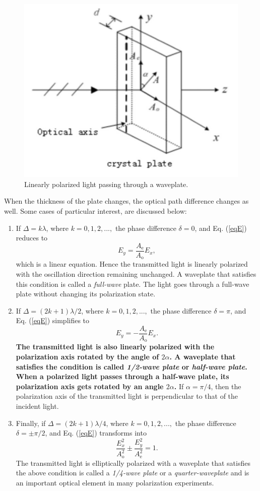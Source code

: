 \documentclass{article}
\begin{document}
\begin{figure}[H]\centering
\includegraphics[scale=1.0]{crystal.png}
\caption{Linearly polarized light passing through a waveplate.}\label{FigCrystal}
\end{figure}

When the thickness of the plate changes, the optical path difference changes as well. Some cases of particular interest, are discussed below: 

\begin{enumerate}[$\blacktriangleright$]
\item If $\Delta = k\lambda$, where $k = 0,1,2,...,$ the phase difference $\delta = 0$, and Eq. (\ref{eqE}) reduces to
$$E_y = \frac{A_\text{e}}{A_\text{o}}E_x,$$
which is a linear equation. Hence the transmitted light is linearly polarized with the oscillation direction remaining unchanged. A waveplate that satisfies this condition is called a \textit{full-wave} plate. The light goes through a full-wave plate without changing its polarization state.
\item If $\Delta = (2k + 1)\lambda/2$, where $k = 0,1,2,...,$ the phase difference $\delta = \pi$, and Eq. (\ref{eqE}) simplifies to
$$E_y = -\frac{A_\text{e}}{A_\text{o}}E_x.$$  
\textbf{The transmitted light is also linearly polarized with the polarization axis rotated by the angle of $2\alpha$. A waveplate that satisfies the condition is called \textit{1/2-wave plate} or \textit{half-wave plate}. When a polarized light passes through a half-wave plate, its polarization axis gets rotated by an angle $2\alpha$.} If $\alpha = \pi/4$, then the polarization axis of the transmitted light is perpendicular to that of the incident light.
\item Finally, if $\Delta = (2k + 1)\lambda/4$, where $k = 0,1,2,...,$ the phase difference $\delta = \pm\pi/2$, and Eq. (\ref{eqE}) transforms into
$$\frac{E_x^2}{A_\text{o}^2} \pm \frac{E_y^2}{A_\text{e}^2} = 1.$$
The transmitted light is elliptically polarized with a waveplate that satisfies the above condition is called a \textit{1/4-wave plate} or a \textit{quarter-waveplate} and is an important optical element in many polarization experiments.
\end{enumerate}
\end{document}

